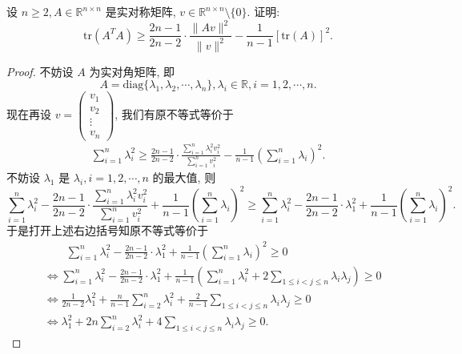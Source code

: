 \documentclass[../../main.tex]{subfiles}%
\begin{document}
\begin{example}
设 \( n \geqslant 2, A \in \mathbb{R}^{n \times n} \) 是实对称矩阵, \( v \in \mathbb{R}^{n \times n} \setminus \{0\} \). 证明:
\[
\text{tr}(A^TA) \geqslant \frac{2n - 1}{2n - 2} \cdot \frac{\|Av\|^2}{\|v\|^2} - \frac{1}{n - 1}[\text{tr}(A)]^2.
\]
\end{example}
\begin{proof}

不妨设 \( A \) 为实对角矩阵, 即
\[
A = \text{diag}\{\lambda_1, \lambda_2, \cdots, \lambda_n\}, \lambda_i \in \mathbb{R}, i = 1,2,\cdots, n.
\]
现在再设 \( v = \begin{pmatrix} v_1 \\ v_2 \\ \vdots \\ v_n \end{pmatrix} \), 我们有原不等式等价于
\begin{align*}
\sum\limits_{i=1}^n \lambda_i^2 \geqslant \frac{2n - 1}{2n - 2} \cdot \frac{\sum\limits_{i=1}^n \lambda_i^2 v_i^2}{\sum\limits_{i=1}^n v_i^2} - \frac{1}{n - 1} \left( \sum\limits_{i=1}^n \lambda_i \right)^2. 
\end{align*}
不妨设 \( \lambda_1 \) 是 \( \lambda_i, i = 1,2,\cdots, n \) 的最大值, 则
\[
\sum\limits_{i=1}^n \lambda_i^2 - \frac{2n - 1}{2n - 2} \cdot \frac{\sum\limits_{i=1}^n \lambda_i^2 v_i^2}{\sum\limits_{i=1}^n v_i^2} + \frac{1}{n - 1} \left( \sum\limits_{i=1}^n \lambda_i \right)^2 \geqslant \sum\limits_{i=1}^n \lambda_i^2 - \frac{2n - 1}{2n - 2} \cdot \lambda_1^2 + \frac{1}{n - 1} \left( \sum\limits_{i=1}^n \lambda_i \right)^2.
\]
于是打开上述右边括号知原不等式等价于
\begin{align}
&\quad \quad \sum\limits_{i=1}^n{\lambda _{i}^{2}}-\frac{2n-1}{2n-2}\cdot \lambda _{1}^{2}+\frac{1}{n-1}\left( \sum\limits_{i=1}^n{\lambda _i} \right) ^2\geqslant 0
\nonumber \\
&\Longleftrightarrow \sum\limits_{i=1}^n{\lambda _{i}^{2}}-\frac{2n-1}{2n-2}\cdot \lambda _{1}^{2}+\frac{1}{n-1}\left( \sum\limits_{i=1}^n{\lambda _{i}^{2}}+2\sum\limits_{1\leqslant i<j\leqslant n}{\lambda _i\lambda _j} \right) \geqslant 0
\nonumber \\
&\Longleftrightarrow \frac{1}{2n-2}\lambda _{1}^{2}+\frac{n}{n-1}\sum\limits_{i=2}^n{\lambda _{i}^{2}}+\frac{2}{n-1}\sum\limits_{1\leqslant i<j\leqslant n}{\lambda _i\lambda _j}\geqslant 0
\nonumber \\
&\Longleftrightarrow \lambda _{1}^{2}+2n\sum\limits_{i=2}^n{\lambda _{i}^{2}}+4\sum\limits_{1\leqslant i<j\leqslant n}{\lambda _i\lambda _j}\geqslant 0.\label{eq:::-----1568165435
}
\end{align}
\end{proof}
\end{document}

